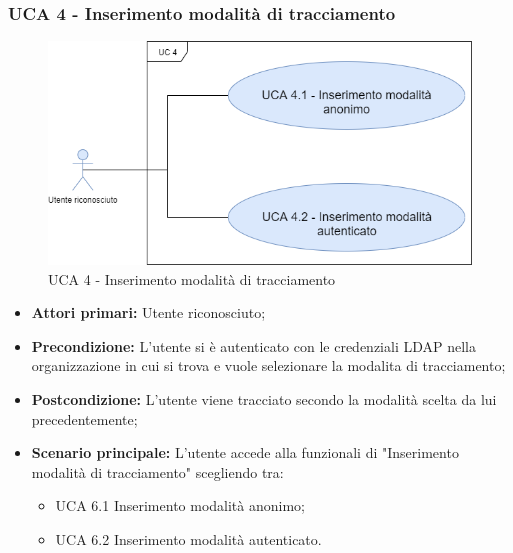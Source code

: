 \newpage

\subsubsection{UCA 4 - Inserimento modalità di tracciamento}%

\begin{figure}[h]
	\centering	
	\includegraphics[scale=0.53]{sezioni/UseCase/Immagini/UCA4.png}
	\caption{UCA 4 - Inserimento modalità di tracciamento}
\end{figure}

\begin{itemize}
	\item \textbf{Attori primari:} Utente riconosciuto;
	\item \textbf{Precondizione:} L'utente si è autenticato con le credenziali LDAP nella organizzazione in cui si trova e vuole selezionare la modalita di tracciamento;
	\item \textbf{Postcondizione:} L'utente viene tracciato secondo la modalità scelta da lui precedentemente; 
	\item \textbf{Scenario principale:} L'utente accede alla funzionali di "Inserimento modalità di tracciamento" scegliendo tra:
	\begin{itemize}
		\item UCA 6.1 Inserimento modalità anonimo;
		\item UCA 6.2 Inserimento modalità autenticato.
	\end{itemize}
\end{itemize}

